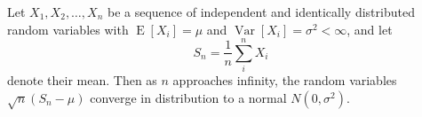 \documentclass{article}
\begin{document}
Let $X_1, X_2, \ldots, X_n$ be a sequence of independent and
identically distributed random variables with
$\operatorname{E}[X_i] = \mu$ and
$\operatorname{Var}[X_i] = \sigma^2 < \infty$, and let
\begin{equation*}
S_n = \frac{1}{n}\sum_{i}^{n} X_i
\end{equation*}
denote their mean. Then as $n$ approaches infinity, the
random variables $\sqrt{n}(S_n - \mu)$ converge in
distribution to a normal $N(0, \sigma^2)$.
\end{document}
